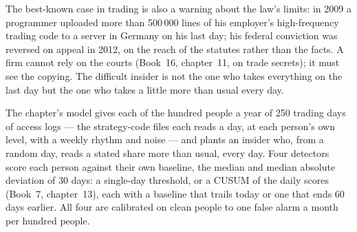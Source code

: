 The best-known case in trading is also a warning about the law's limits: in 2009 a programmer uploaded more than 500\,000 lines of his
employer's high-frequency trading code to a server in Germany on his last day; his federal conviction was reversed on appeal in 2012, on
the reach of the statutes rather than the facts. A firm cannot rely on the courts (Book~16, chapter~11, on trade secrets); it must see the
copying. The difficult insider is not the one who takes everything on the last day but the one who takes a little more than usual every day.

The chapter's model gives each of the hundred people a year of 250 trading days of access logs --- the strategy-code files each reads a
day, at each person's own level, with a weekly rhythm and noise --- and plants an insider who, from a random day, reads a stated share more
than usual, every day. Four detectors score each person against their own baseline, the median and median absolute deviation of 30 days:
a single-day threshold, or a CUSUM of the daily scores (Book~7, chapter~13), each with a baseline that trails today or one that ends 60 days
earlier. All four are calibrated on clean people to one false alarm a month per hundred people.

\label{lst:pl:security:scores}

